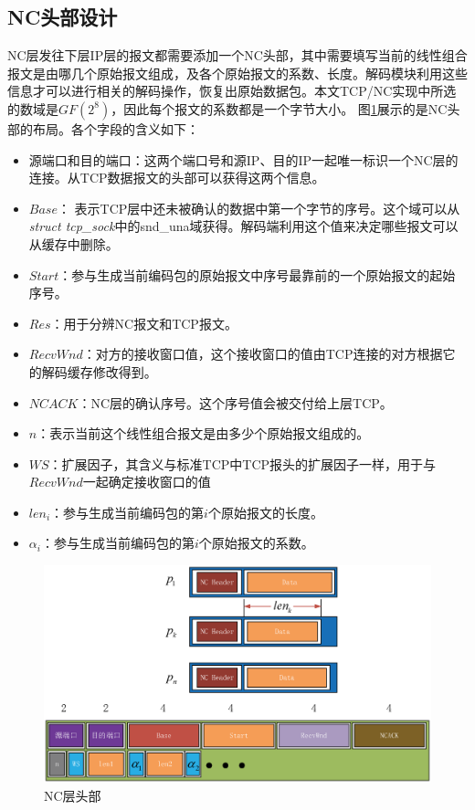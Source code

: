 \subsection{NC头部设计}
NC层发往下层IP层的报文都需要添加一个NC头部，其中需要填写当前的线性组合报文是由哪几个原始报文组成，及各个原始报文的系数、长度。解码模块利用这些信息才可以进行相关的解码操作，恢复出原始数据包。本文TCP/NC实现中所选的数域是$GF\left(2^8\right)$，因此每个报文的系数都是一个字节大小。
图\ref{CODINGHEADER_EPS}展示的是NC头部的布局。各个字段的含义如下：
\begin{itemize}[leftmargin=.5in]
	\item 源端口和目的端口：这两个端口号和源IP、目的IP一起唯一标识一个NC层的连接。从TCP数据报文的头部可以获得这两个信息。
	\item $Base$： 表示TCP层中还未被确认的数据中第一个字节的序号。这个域可以从\emph{struct tcp\_sock}中的snd\_una域获得。解码端利用这个值来决定哪些报文可以从缓存中删除。
	\item $Start$：参与生成当前编码包的原始报文中序号最靠前的一个原始报文的起始序号。
	\item $Res$：用于分辨NC报文和TCP报文。
	\item $RecvWnd$：对方的接收窗口值，这个接收窗口的值由TCP连接的对方根据它的解码缓存修改得到。
	\item $NCACK$：NC层的确认序号。这个序号值会被交付给上层TCP。
	\item $n$：表示当前这个线性组合报文是由多少个原始报文组成的。
	\item $WS$：扩展因子，其含义与标准TCP中TCP报头的扩展因子一样，用于与$RecvWnd$一起确定接收窗口的值
	\item $len_{i}$：参与生成当前编码包的第$i$个原始报文的长度。
	\item $\alpha_{i}$：参与生成当前编码包的第$i$个原始报文的系数。
\end{itemize}
\begin{figure}[htbp] 
	\centering
	\includegraphics[width=5in]{figures/codingheader.eps}
	\caption{NC层头部}
	\label{CODINGHEADER_EPS}
\end{figure}
